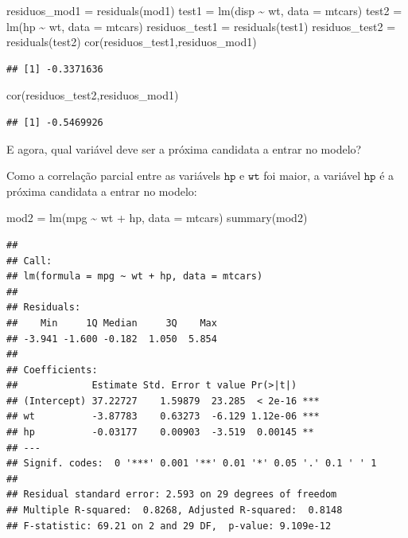 \documentclass[
]{book}
\newenvironment{Shaded}{\begin{snugshade}}{\end{snugshade}}
\newcommand{\AttributeTok}[1]{\textcolor[rgb]{0.77,0.63,0.00}{#1}}
\newcommand{\FunctionTok}[1]{\textcolor[rgb]{0.00,0.00,0.00}{#1}}
\newcommand{\NormalTok}[1]{#1}
\newcommand{\OtherTok}[1]{\textcolor[rgb]{0.56,0.35,0.01}{#1}}
\newcommand{\SpecialCharTok}[1]{\textcolor[rgb]{0.00,0.00,0.00}{#1}}
\begin{document}
\begin{Shaded}
\begin{Highlighting}[]
\NormalTok{residuos\_mod1 }\OtherTok{=} \FunctionTok{residuals}\NormalTok{(mod1)}
\NormalTok{test1 }\OtherTok{=} \FunctionTok{lm}\NormalTok{(disp }\SpecialCharTok{\textasciitilde{}}\NormalTok{ wt, }\AttributeTok{data =}\NormalTok{ mtcars)}
\NormalTok{test2 }\OtherTok{=} \FunctionTok{lm}\NormalTok{(hp }\SpecialCharTok{\textasciitilde{}}\NormalTok{ wt, }\AttributeTok{data =}\NormalTok{ mtcars)}
\NormalTok{residuos\_test1 }\OtherTok{=} \FunctionTok{residuals}\NormalTok{(test1)}
\NormalTok{residuos\_test2 }\OtherTok{=} \FunctionTok{residuals}\NormalTok{(test2)}
\FunctionTok{cor}\NormalTok{(residuos\_test1,residuos\_mod1)}
\end{Highlighting}
\end{Shaded}

\begin{verbatim}
## [1] -0.3371636
\end{verbatim}

\begin{Shaded}
\begin{Highlighting}[]
\FunctionTok{cor}\NormalTok{(residuos\_test2,residuos\_mod1)}
\end{Highlighting}
\end{Shaded}

\begin{verbatim}
## [1] -0.5469926
\end{verbatim}

E agora, qual variável deve ser a próxima candidata a entrar no modelo?

Como a correlação parcial entre as variávels \(\texttt{hp}\) e \(\texttt{wt}\) foi maior, a variável \(\texttt{hp}\) é a próxima candidata a entrar no modelo:

\begin{Shaded}
\begin{Highlighting}[]
\NormalTok{mod2 }\OtherTok{=} \FunctionTok{lm}\NormalTok{(mpg }\SpecialCharTok{\textasciitilde{}}\NormalTok{ wt }\SpecialCharTok{+}\NormalTok{ hp, }\AttributeTok{data =}\NormalTok{ mtcars)}
\FunctionTok{summary}\NormalTok{(mod2)}
\end{Highlighting}
\end{Shaded}

\begin{verbatim}
## 
## Call:
## lm(formula = mpg ~ wt + hp, data = mtcars)
## 
## Residuals:
##    Min     1Q Median     3Q    Max 
## -3.941 -1.600 -0.182  1.050  5.854 
## 
## Coefficients:
##             Estimate Std. Error t value Pr(>|t|)    
## (Intercept) 37.22727    1.59879  23.285  < 2e-16 ***
## wt          -3.87783    0.63273  -6.129 1.12e-06 ***
## hp          -0.03177    0.00903  -3.519  0.00145 ** 
## ---
## Signif. codes:  0 '***' 0.001 '**' 0.01 '*' 0.05 '.' 0.1 ' ' 1
## 
## Residual standard error: 2.593 on 29 degrees of freedom
## Multiple R-squared:  0.8268, Adjusted R-squared:  0.8148 
## F-statistic: 69.21 on 2 and 29 DF,  p-value: 9.109e-12
\end{verbatim}
\end{document}
